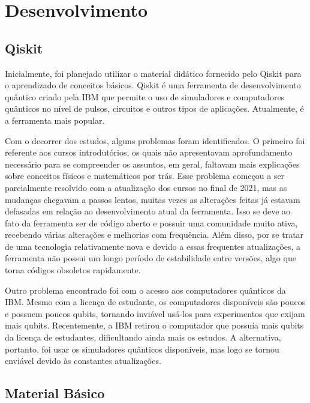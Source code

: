 \chapter{Desenvolvimento}\label{ch:desenvolvimento}

\section{Qiskit}\label{sec:qiskit}

Inicialmente, foi planejado utilizar o material didático fornecido pelo Qiskit para o aprendizado de conceitos básicos.
Qiskit é uma ferramenta de desenvolvimento quântico criado pela IBM que permite o uso de simuladores e computadores quânticos no nível de pulsos, circuitos e outros tipos de aplicações.
Atualmente, é a ferramenta mais popular.

Com o decorrer dos estudos, alguns problemas foram identificados.
O primeiro foi referente aos cursos introdutórios, os quais não apresentavam aprofundamento necessário para se compreender os assuntos, em geral, faltavam mais explicações sobre conceitos físicos e matemáticos por trás.
Esse problema começou a ser parcialmente resolvido com a atualização dos cursos no final de 2021, mas as mudanças chegavam a passos lentos, muitas vezes as alterações feitas já estavam defasadas em relação ao desenvolvimento atual da ferramenta.
Isso se deve ao fato da ferramenta ser de código aberto e possuir uma comunidade muito ativa, recebendo várias alterações e melhorias com frequência.
Além disso, por se tratar de uma tecnologia relativamente nova e devido a essas frequentes atualizações, a ferramenta não possui um longo período de estabilidade entre versões, algo que torna códigos obsoletos rapidamente.

Outro problema encontrado foi com o acesso aos computadores quânticos da IBM.
Mesmo com a licença de estudante, os computadores disponíveis são poucos e possuem poucos qubits, tornando inviável usá-los para experimentos que exijam mais qubits.
Recentemente, a IBM retirou o computador que possuía mais qubits da licença de estudantes, dificultando ainda mais os estudos.
A alternativa, portanto, foi usar os simuladores quânticos disponíveis, mas logo se tornou enviável devido às constantes atualizações.

\section{Material Básico}\label{sec:material-basico}

